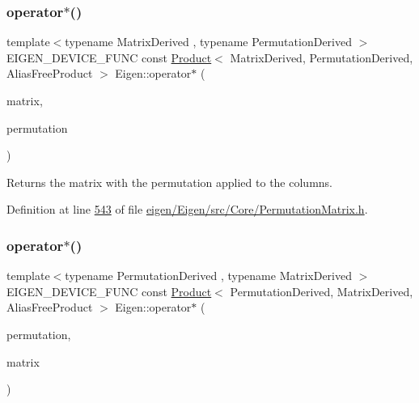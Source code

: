 \subsubsection{\texorpdfstring{operator$\ast$()}{operator*()}\hspace{0.1cm}{\footnotesize\ttfamily [8/9]}}
{\footnotesize\ttfamily template$<$typename Matrix\+Derived , typename Permutation\+Derived $>$ \\
E\+I\+G\+E\+N\+\_\+\+D\+E\+V\+I\+C\+E\+\_\+\+F\+U\+NC const \hyperlink{group___core___module_class_eigen_1_1_product}{Product}$<$ Matrix\+Derived, Permutation\+Derived, Alias\+Free\+Product $>$ Eigen\+::operator$\ast$ (\begin{DoxyParamCaption}\item[{const \hyperlink{group___core___module_class_eigen_1_1_matrix_base}{Matrix\+Base}$<$ Matrix\+Derived $>$ \&}]{matrix,  }\item[{const \hyperlink{group___core___module_class_eigen_1_1_permutation_base}{Permutation\+Base}$<$ Permutation\+Derived $>$ \&}]{permutation }\end{DoxyParamCaption})}

\begin{DoxyReturn}{Returns}
the matrix with the permutation applied to the columns. 
\end{DoxyReturn}


Definition at line \hyperlink{eigen_2_eigen_2src_2_core_2_permutation_matrix_8h_source_l00543}{543} of file \hyperlink{eigen_2_eigen_2src_2_core_2_permutation_matrix_8h_source}{eigen/\+Eigen/src/\+Core/\+Permutation\+Matrix.\+h}.

\mbox{\label{namespace_eigen_a5954e0288e506706e8d2c8cd5ff5b7d2}} 
\subsubsection{\texorpdfstring{operator$\ast$()}{operator*()}\hspace{0.1cm}{\footnotesize\ttfamily [9/9]}}
{\footnotesize\ttfamily template$<$typename Permutation\+Derived , typename Matrix\+Derived $>$ \\
E\+I\+G\+E\+N\+\_\+\+D\+E\+V\+I\+C\+E\+\_\+\+F\+U\+NC const \hyperlink{group___core___module_class_eigen_1_1_product}{Product}$<$ Permutation\+Derived, Matrix\+Derived, Alias\+Free\+Product $>$ Eigen\+::operator$\ast$ (\begin{DoxyParamCaption}\item[{const \hyperlink{group___core___module_class_eigen_1_1_permutation_base}{Permutation\+Base}$<$ Permutation\+Derived $>$ \&}]{permutation,  }\item[{const \hyperlink{group___core___module_class_eigen_1_1_matrix_base}{Matrix\+Base}$<$ Matrix\+Derived $>$ \&}]{matrix }\end{DoxyParamCaption})}

